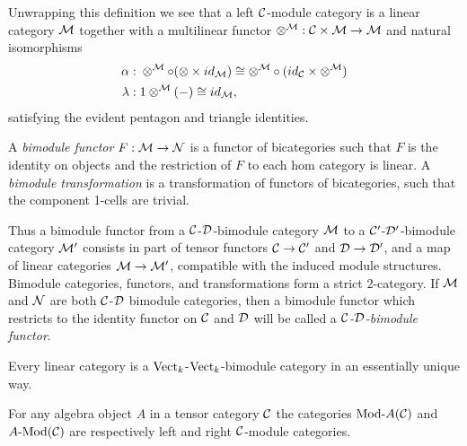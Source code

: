 \documentclass{amsart}
\begin{document}
Unwrapping this definition we see that a left $\mathcal C$-module category is a linear category $\mathcal M$ together with a multilinear functor $\otimes^{\mathcal M}: \mathcal C \times \mathcal M \to \mathcal M$ and natural isomorphisms
	\begin{align*}
		\alpha: & \;    \otimes^{\mathcal M} \circ (\otimes \times id_{\mathcal M}) \cong  \otimes^{\mathcal M} \circ (id_{\mathcal C} \times \otimes^{\mathcal M}) \\
		\lambda: & \; 1 \otimes^{\mathcal M}(-) \cong id_{\mathcal M},
	\end{align*}
	satisfying the evident pentagon and triangle identities. 

\begin{definition}
	A {\em bimodule functor} $F:\mathcal M \to \mathcal N$ is a functor of bicategories such that
		 $F$ is the identity on objects and 
		 the restriction of $F$ to each hom category is linear. 
	A {\em bimodule transformation} is a transformation of functors of bicategories, such that the component 1-cells are trivial. 
\end{definition}
	
Thus a bimodule functor from a $\mathcal C$-$\mathcal D$-bimodule category $\mathcal M$ to a $\mathcal C'$-$\mathcal D'$-bimodule category $\mathcal M'$ consists in part of tensor functors $\mathcal C \to \mathcal C'$ and $\mathcal D \to \mathcal D'$, and a map of linear categories $\mathcal M \to \mathcal M'$, compatible with the induced module structures. Bimodule categories, functors, and transformations form a strict 2-category. 	
If $\mathcal M$ and $\mathcal N$ are both $\mathcal C$-$\mathcal D$ bimodule categories, then a bimodule functor which restricts to the identity functor on $\mathcal C$ and $\mathcal D$ will be called a {\em $\mathcal C$-$\mathcal D$-bimodule functor}.

\begin{example}
	Every linear category is a $\mathrm{Vect}_k$-$\mathrm{Vect}_k$-bimodule category in an essentially unique way. 
\end{example}

\begin{example}
	For any algebra object $A$ in a tensor category $\mathcal C$ the categories $\Mod{}{A}(\cC)$ and $\Mod{A}{}(\cC)$ are respectively left and right $\mathcal C$-module categories. 
\end{example}
\end{document}
